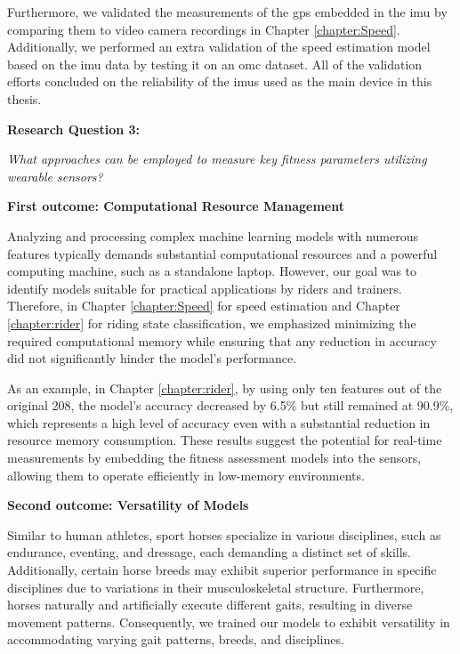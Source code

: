 Furthermore, we validated the measurements of the \gls{gps} embedded in the \gls{imu} by comparing them to video camera recordings in Chapter \ref{chapter:Speed}. Additionally, we performed an extra validation of the speed estimation model based on the \gls{imu} data by testing it on an \gls{omc} dataset. All of the validation efforts concluded on the reliability of the \gls{imu}s used as the main device in this thesis.

\vspace{0.3cm}

\noindent\textbf{\large Research Question 3:}

    \textit{What approaches can be employed to measure key fitness parameters utilizing wearable sensors?}
\vspace{0.15cm}

\noindent\textbf{First outcome: Computational Resource Management}

Analyzing and processing complex machine learning models with numerous features typically demands substantial computational resources and a powerful computing machine, such as a standalone laptop. However, our goal was to identify models suitable for practical applications by riders and trainers. Therefore, in Chapter \ref{chapter:Speed} for speed estimation and Chapter \ref{chapter:rider} for riding state classification, we emphasized minimizing the required computational memory while ensuring that any reduction in accuracy did not significantly hinder the model's performance.

As an example, in Chapter \ref{chapter:rider}, by using only ten features out of the original 208, the model's accuracy decreased by 6.5\% but still remained at 90.9\%, which represents a high level of accuracy even with a substantial reduction in resource memory consumption. These results suggest the potential for real-time measurements by embedding the fitness assessment models into the sensors, allowing them to operate efficiently in low-memory environments.

\vspace{0.15cm}

\noindent\textbf{Second outcome: Versatility of Models}

Similar to human athletes, sport horses specialize in various disciplines, such as endurance, eventing, and dressage, each demanding a distinct set of skills. Additionally, certain horse breeds may exhibit superior performance in specific disciplines due to variations in their musculoskeletal structure. Furthermore, horses naturally and artificially execute different gaits, resulting in diverse movement patterns. Consequently, we trained our models to exhibit versatility in accommodating varying gait patterns, breeds, and disciplines. 

